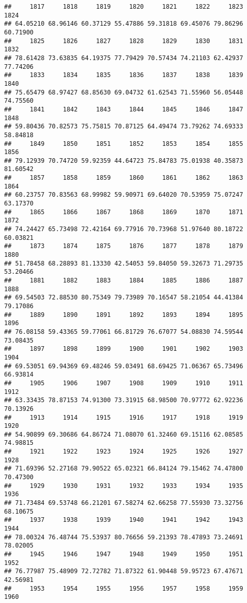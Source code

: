 \documentclass[
]{article}
\begin{document}
\begin{verbatim}
##     1817     1818     1819     1820     1821     1822     1823     1824 
## 64.05210 68.96146 60.37129 55.47886 59.31818 69.45076 79.86296 60.71900 
##     1825     1826     1827     1828     1829     1830     1831     1832 
## 78.61428 73.63835 64.19375 77.79429 70.57434 74.21103 62.42937 77.74206 
##     1833     1834     1835     1836     1837     1838     1839     1840 
## 75.65479 68.97427 68.85630 69.04732 61.62543 71.55960 56.05448 74.75560 
##     1841     1842     1843     1844     1845     1846     1847     1848 
## 59.80436 70.82573 75.75815 70.87125 64.49474 73.79262 74.69333 58.84818 
##     1849     1850     1851     1852     1853     1854     1855     1856 
## 79.12939 70.74720 59.92359 44.64723 75.84783 75.01938 40.35873 81.60542 
##     1857     1858     1859     1860     1861     1862     1863     1864 
## 60.23757 70.83563 68.99982 59.90971 69.64020 70.53959 75.07247 63.17370 
##     1865     1866     1867     1868     1869     1870     1871     1872 
## 74.24427 65.73498 72.42164 69.77916 70.73968 51.97640 80.18722 60.03821 
##     1873     1874     1875     1876     1877     1878     1879     1880 
## 51.78458 68.28893 81.13330 42.54053 59.84050 59.32673 71.29735 53.20466 
##     1881     1882     1883     1884     1885     1886     1887     1888 
## 69.54503 72.88530 80.75349 79.73989 70.16547 58.21054 44.41384 79.17086 
##     1889     1890     1891     1892     1893     1894     1895     1896 
## 76.08158 59.43365 59.77061 66.81729 76.67077 54.08830 74.59544 73.08435 
##     1897     1898     1899     1900     1901     1902     1903     1904 
## 69.53051 69.94369 69.48246 59.03491 68.69425 71.06367 65.73496 66.93814 
##     1905     1906     1907     1908     1909     1910     1911     1912 
## 63.33435 78.87153 74.91300 73.31915 68.98500 70.97772 62.92236 70.13926 
##     1913     1914     1915     1916     1917     1918     1919     1920 
## 54.90899 69.30686 64.86724 71.08070 61.32460 69.15116 62.08585 74.98815 
##     1921     1922     1923     1924     1925     1926     1927     1928 
## 71.69396 52.27168 79.90522 65.02321 66.84124 79.15462 74.47800 70.47300 
##     1929     1930     1931     1932     1933     1934     1935     1936 
## 71.73484 69.53748 66.21201 67.58274 62.66258 77.55930 73.32756 68.10675 
##     1937     1938     1939     1940     1941     1942     1943     1944 
## 78.00324 76.48744 75.53937 80.76656 59.21393 78.47893 73.24691 78.02005 
##     1945     1946     1947     1948     1949     1950     1951     1952 
## 76.77987 75.48909 72.72782 71.87322 61.90448 59.95723 67.47671 42.56981 
##     1953     1954     1955     1956     1957     1958     1959     1960 

\end{verbatim}
\end{document}
